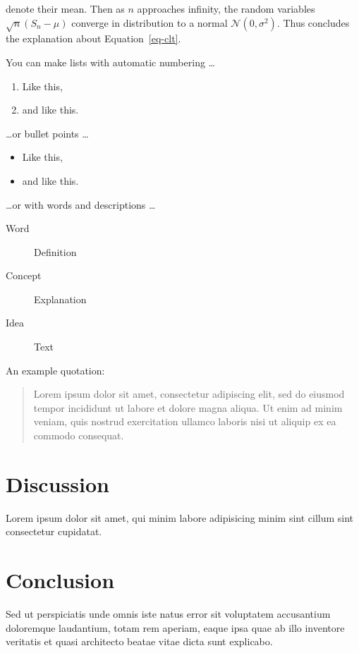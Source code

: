 \documentclass[
  twocolumn]{biophys-new-mod}
\begin{document}
denote their mean. Then as \(n\) approaches infinity, the random
variables \(\sqrt{n}(S_n - \mu)\) converge in distribution to a normal
\(\mathcal{N}(0, \sigma^2)\). Thus concludes the explanation about
Equation~\ref{eq-clt}.

You can make lists with automatic numbering \ldots{}

\begin{enumerate}
\def\labelenumi{\arabic{enumi}.}
\item
  Like this,
\item
  and like this.
\end{enumerate}

\ldots or bullet points \ldots{}

\begin{itemize}
\item
  Like this,
\item
  and like this.
\end{itemize}

\ldots or with words and descriptions \ldots{}

\begin{description}
\item[Word]
Definition
\item[Concept]
Explanation
\item[Idea]
Text
\end{description}

An example quotation:

\begin{quote}
Lorem ipsum dolor sit amet, consectetur adipiscing elit, sed do eiusmod
tempor incididunt ut labore et dolore magna aliqua. Ut enim ad minim
veniam, quis nostrud exercitation ullamco laboris nisi ut aliquip ex ea
commodo consequat.
\end{quote}

\hypertarget{discussion}{%
\section{Discussion}\label{discussion}}

Lorem ipsum dolor sit amet, qui minim labore adipisicing minim sint
cillum sint consectetur cupidatat.

\hypertarget{conclusion}{%
\section{Conclusion}\label{conclusion}}

Sed ut perspiciatis unde omnis iste natus error sit voluptatem
accusantium doloremque laudantium, totam rem aperiam, eaque ipsa quae ab
illo inventore veritatis et quasi architecto beatae vitae dicta sunt
explicabo.
\end{document}
